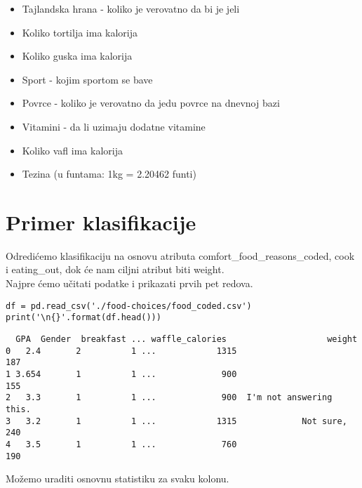 \documentclass[12pt,a4paper]{article}
\begin{document}
\begin{itemize}
  \item Tajlandska hrana - koliko je verovatno da bi je jeli\\
  \item Koliko tortilja ima kalorija\\
  \item Koliko guska ima kalorija\\
  \item Sport - kojim sportom se bave\\
  \item Povrce - koliko je verovatno da jedu povrce na dnevnoj bazi\\
  \item Vitamini - da li uzimaju dodatne vitamine\\
  \item Koliko vafl ima kalorija\\
  \item Tezina (u funtama: 1kg = 2.20462 funti)\\
\end{itemize}

\section{Primer klasifikacije}

Odredi\' cemo klasifikaciju na osnovu atributa comfort\_food\_reasons\_coded, cook i eating\_out, dok \' ce nam ciljni atribut biti weight.\\

Najpre \' cemo u\v citati podatke i prikazati prvih pet redova.\\

\begin{lstlisting}[mathescape=true]
df = pd.read_csv('./food-choices/food_coded.csv')
print('\n{}'.format(df.head()))
\end{lstlisting}

\begin{verbatim}
  GPA  Gender  breakfast ... waffle_calories                    weight
0   2.4       2          1 ...            1315                       187
1 3.654       1          1 ...             900                       155
2   3.3       1          1 ...             900  I'm not answering this.
3   3.2       1          1 ...            1315             Not sure, 240
4   3.5       1          1 ...             760                       190
\end{verbatim}

Mo\v zemo uraditi osnovnu statistiku za svaku kolonu.
\end{document}
